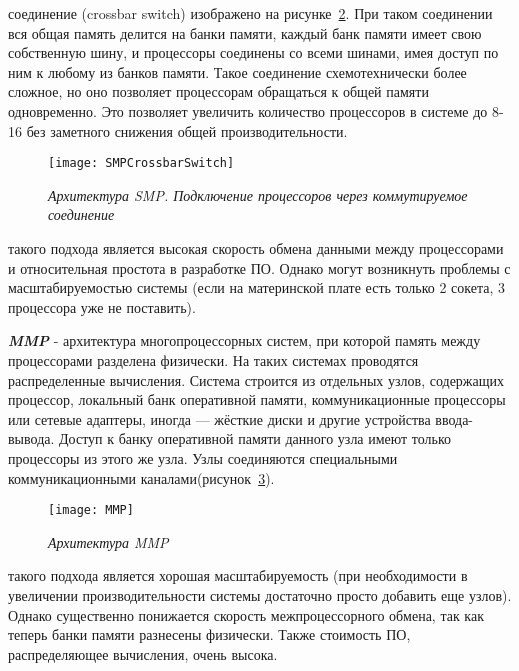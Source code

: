 {\begin{itemize}
\begin{figure}[H]
					\label{SMPSystemBus:image}
				\end{figure}
			 соединение (crossbar switch) изображено на рисунке~\ref{SMPCrossbarSwitch:image}. При таком соединении вся общая память делится на банки памяти, каждый банк памяти имеет свою собственную шину, и процессоры соединены со всеми шинами, имея доступ по ним к любому из банков памяти. Такое соединение схемотехнически более сложное, но оно позволяет процессорам обращаться к общей памяти одновременно. Это позволяет увеличить количество процессоров в системе до 8-16 без заметного снижения общей производительности.
				\begin{figure}[H]
					\texttt{[image: SMPCrossbarSwitch]}
					\caption{\textit{Архитектура SMP. Подключение процессоров через коммутируемое соединение}}
					\label{SMPCrossbarSwitch:image}
				\end{figure}
		\end{itemize}
	 такого подхода является высокая скорость обмена данными между процессорами и относительная простота в разработке ПО. Однако могут возникнуть проблемы с масштабируемостью системы (если на материнской плате есть только 2 сокета, 3 процессора уже не поставить).
	\par\textbf{\textit{MMP}} - архитектура многопроцессорных систем, при которой память между процессорами разделена физически. На таких системах проводятся распределенные вычисления. Система строится из отдельных узлов, содержащих процессор, локальный банк оперативной памяти, коммуникационные процессоры или сетевые адаптеры, иногда — жёсткие диски и другие устройства ввода-вывода. Доступ к банку оперативной памяти данного узла имеют только процессоры из этого же узла. Узлы соединяются специальными коммуникационными каналами(рисунок~\ref{MMP:image}).
		\begin{figure}[H]
			\texttt{[image: MMP]}
			\caption{\textit{Архитектура MMP}}
			\label{MMP:image}
		\end{figure}
	 такого подхода является хорошая масштабируемость (при необходимости в увеличении производительности системы достаточно просто добавить еще узлов). Однако существенно понижается скорость межпроцессорного обмена, так как теперь банки памяти разнесены физически. Также стоимость ПО, распределяющее вычисления, очень высока.
	\par
}